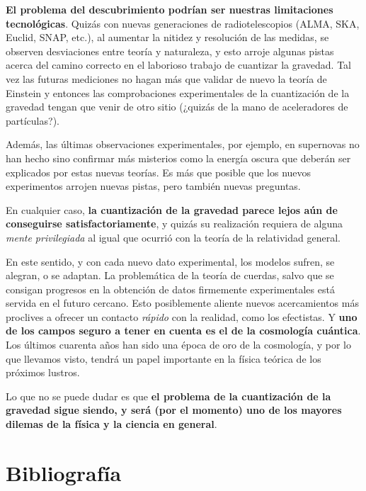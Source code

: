 \documentclass[11pt,a4paper,titlepage]{article}
\begin{document}
\textbf{El problema del descubrimiento podrían ser nuestras limitaciones tecnológicas}. Quizás con nuevas generaciones de radiotelescopios (ALMA, SKA, Euclid, SNAP, etc.), al aumentar la nitidez y resolución de las medidas, se observen desviaciones entre teoría y naturaleza, y esto arroje algunas pistas acerca del camino correcto en el laborioso trabajo de cuantizar la gravedad. Tal vez las futuras mediciones no hagan más que validar de nuevo la teoría de Einstein y entonces las comprobaciones experimentales de la cuantización de la gravedad tengan que venir de otro sitio (¿quizás de la mano de aceleradores de partículas?).

Además, las últimas observaciones experimentales, por ejemplo, en supernovas no han hecho sino confirmar más misterios como la energía oscura que deberán ser explicados por estas nuevas teorías. Es más que posible que los nuevos experimentos arrojen nuevas pistas, pero también nuevas preguntas.

En cualquier caso, \textbf{la cuantización de la gravedad parece lejos aún de conseguirse satisfactoriamente}, y quizás su realización requiera de alguna \textit{mente privilegiada} al igual que ocurrió con la teoría de la relatividad general.

En este sentido, y con cada nuevo dato experimental, los modelos sufren, se alegran, o se adaptan. La problemática de la teoría de cuerdas, salvo que se consigan progresos en la obtención de datos firmemente experimentales está servida en el futuro cercano. Esto posiblemente aliente nuevos acercamientos más proclives a ofrecer un contacto \textit{rápido} con la realidad, como los efectistas. Y \textbf{uno de los campos seguro a tener en cuenta es el de la cosmología cuántica}. Los últimos cuarenta años han sido una época de oro de la cosmología, y por lo que llevamos visto, tendrá un papel importante en la física teórica de los próximos lustros.

Lo que no se puede dudar es que \textbf{el problema de la cuantización de la gravedad sigue siendo, y será (por el momento) uno de los mayores dilemas de la física y la ciencia en general}.

%
%
%
%
\newpage
\section{Bibliografía}


\nocite{*}
\end{document}
